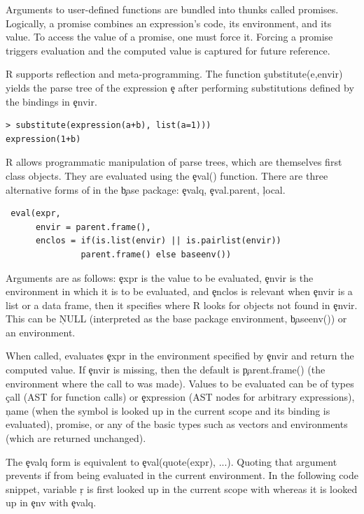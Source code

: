 \documentclass[conference]{IEEEtran}
\begin{document}
Arguments to user-defined functions are bundled into thunks called
promises. Logically, a promise combines an expression's code, its
environment, and its value.  To access the value of a promise, one must
force it. Forcing a promise triggers evaluation and the computed value is
captured for future reference.


R supports reflection and meta-programming. The function \c{substitute(e,envir)}
yields the parse tree of the expression \c{e} after performing substitutions
defined by the bindings in \c{envir}.

\begin{lstlisting}
> substitute(expression(a+b), list(a=1)))  
expression(1+b)
\end{lstlisting}

\noindent
R allows programmatic manipulation of parse trees, which are themselves
first class objects. They are evaluated using the \c{eval()}
function. There are three alternative forms  of \eval in the \c{base} package:
\c{evalq}, \c{eval.parent}, \c{local}.

\begin{lstlisting}
 eval(expr,
      envir = parent.frame(),
      enclos = if(is.list(envir) || is.pairlist(envir))
               parent.frame() else baseenv())
\end{lstlisting}           

Arguments are as follows: \c{expr} is the value to be evaluated, \c{envir}
is the environment in which it is to be evaluated, and \c{enclos} is
relevant when \c{envir} is a list or a data frame, then it specifies where R
looks for objects not found in \c{envir}. This can be \c{NULL} (interpreted
as the base package environment, \c{baseenv()}) or an environment.

When called, \eval evaluates \c{expr} in the environment specified by
\c{envir} and return the computed value. If \c{envir} is missing, then the
default is \c{parent.frame()} (the environment where the call to \eval was
made).  Values to be evaluated can be of types \c{call} (AST for function
calls) or \c{expression} (AST nodes for arbitrary expressions), \c{name}
(when the symbol is looked up in the current scope and its binding is
evaluated), promise, or any of the basic types such as vectors and
environments (which are returned unchanged).

The \c{evalq} form is equivalent to \c{eval(quote(expr), ...)}.  Quoting
that argument prevents if from being evaluated in the current environment.
In the following code snippet, variable \c{r} is first looked up in
the current scope with \eval whereas it is looked up in \c{env} with
\c{evalq}.
\end{document}
